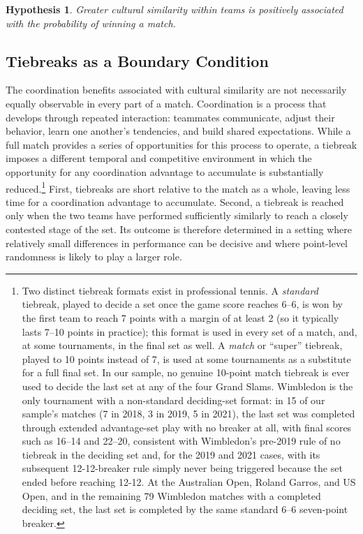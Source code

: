 \documentclass[10pt]{article}
\newtheorem{hypothesis}{Hypothesis}
\begin{document}
\begin{hypothesis}
Greater cultural similarity within teams is positively associated with the probability of winning a match.
\end{hypothesis}
\subsection{Tiebreaks as a Boundary Condition}



The coordination benefits associated with cultural similarity are not necessarily  equally observable in every part of a match. Coordination is a process that develops through repeated interaction: teammates communicate, adjust their behavior, learn one another's tendencies, and build shared expectations. While a full match provides a series of opportunities for this process to operate, a tiebreak imposes a different temporal and competitive environment in which the opportunity for any coordination advantage to accumulate is substantially reduced.\footnote{Two distinct tiebreak formats exist in professional tennis. A \emph{standard} tiebreak, played to decide a set once the game score reaches 6--6, is won by the first team to reach 7 points with a margin of at least 2 (so it typically lasts 7--10 points in practice); this format is used in every set of a match, and, at some tournaments, in the final set as well. A \emph{match} or ``super'' tiebreak, played to 10 points instead of 7, is used at some tournaments as a substitute for a full final set. In our sample, no genuine 10-point match tiebreak is ever used to decide the last set at any of the four Grand Slams. Wimbledon is the only tournament with a non-standard deciding-set format: in 15 of our sample's matches (7 in 2018, 3 in 2019, 5 in 2021), the last set was completed through extended advantage-set play with no breaker at all, with final scores such as 16--14 and 22--20, consistent with Wimbledon's pre-2019 rule of no tiebreak in the deciding set and, for the 2019 and 2021 cases, with its subsequent 12-12-breaker rule simply never being triggered because the set ended before reaching 12-12. At the Australian Open, Roland Garros, and US Open, and in the remaining 79 Wimbledon matches with a completed deciding set, the last set is completed by the same standard 6--6 seven-point breaker.} First, tiebreaks are short relative to the match as a whole, leaving less time for a coordination advantage to accumulate. Second, a tiebreak is reached only when the two teams have performed sufficiently similarly to reach a closely contested stage of the set. Its outcome is therefore determined in a setting where relatively small differences in performance can be decisive and where point-level randomness is likely to play a larger role.
\end{document}
